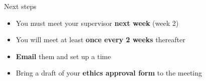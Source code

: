 \begin{frame}{Next steps}
	\begin{itemize}
		\pause\item You must meet your supervisor \textbf{next week} (week 2)
		\pause\item You will meet at least \textbf{once every 2 weeks} thereafter
		\pause\item \textbf{Email} them and set up a time
		\pause\item Bring a draft of your \textbf{ethics approval form} to the meeting
	\end{itemize}
\end{frame}
